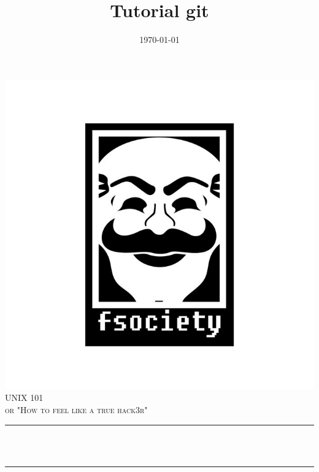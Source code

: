 \documentclass[12pt]{article}
\title{Tutorial git}								%
\date{\today}											%
\makeatletter
\let\thetitle\@title
\let\thedate\@date
\makeatother
\begin{document}

\begin{titlepage}
	\centering
    \vspace*{0.5 cm}
    \includegraphics[scale = 0.3]{resources/logo4.png}\\[1.0 cm]
    \textsc{\LARGE \newline\newline UNIX 101}\\[2.0 cm]
	\textsc{\Large or "How to feel like a true hack3r"}\\[0.5 cm]
	\rule{\linewidth}{0.2 mm} \\[0.4 cm]
	{ \huge \bfseries \thetitle}\\
	\rule{\linewidth}{0.2 mm} \\[1.5 cm]
	
%           
%        
	
	
    \thedate
    
    
    
	
\end{titlepage}
\end{document}
